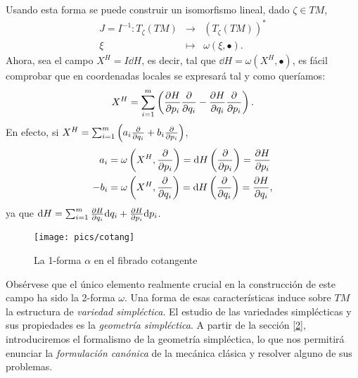 Usando esta forma se puede construir un isomorfismo lineal, dado $\zeta \in TM$,
\begin{equation*}
  \begin{array}{rcl}
    J=I^{-1}: T_{\zeta}(TM) & \longrightarrow & (T_{\zeta}(TM))^* \\
    \xi & \longmapsto & \omega(\xi, \bullet).
  \end{array}
\end{equation*}
Ahora, sea el campo $X^H=I \dd H$, es decir, tal que $\dd H=\omega(X^H,\bullet)$, es fácil comprobar que en coordenadas locales se expresará tal y como queríamos:
\begin{equation*}
  X^H = \sum_{i=1}^m \left( \frac{\partial H}{\partial p_i} \frac{\partial}{\partial q_i} - \frac{\partial H}{\partial q_i} \frac{\partial}{\partial p_i} \right).
\end{equation*}
En efecto, si $X^H=\sum_{i=1}^m \left( a_i \frac{\partial}{\partial q_i} + b_i \frac{\partial}{\partial p_i} \right)$,
\begin{align*}
  a_i&=\omega\left(X^H,\frac{\partial}{\partial p_i}\right)=\mathrm{d} H\left( \frac{\partial}{\partial p_i} \right)=\frac{\partial H}{\partial p_i} \\
  -b_i&=\omega\left(X^H,\frac{\partial}{\partial q_i}\right)=\mathrm{d} H\left( \frac{\partial}{\partial q_i} \right)=\frac{\partial H}{\partial q_i},
\end{align*}
ya que $\mathrm{d} H = \sum_{i=1}^m\frac{\partial H}{\partial q_i}\mathrm{d} q_i + \frac{\partial H}{\partial p_i}\mathrm{d} p_i$.

\begin{figure}[h]
  \centering
  \texttt{[image: pics/cotang]}
  \caption{La 1-forma $\alpha$ en el fibrado cotangente}
  \label{fig:cotang}
\end{figure}

Obsérvese que el único elemento realmente crucial en la construcción de este campo ha sido la 2-forma $\omega$. Una forma de esas características induce sobre $TM$ la estructura de \emph{variedad simpléctica}. El estudio de las variedades simplécticas y sus propiedades es la \emph{geometría simpléctica}. A partir de la sección \ref{2}, introduciremos el formalismo de la geometría simpléctica, lo que nos permitirá enunciar la \emph{formulación canónica} de la mecánica clásica y resolver alguno de sus problemas.


